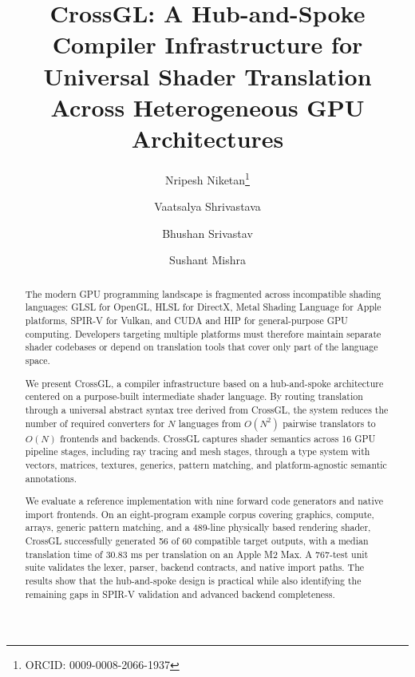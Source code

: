 \documentclass{svproc}
\begin{document}
\raggedbottom
\mainmatter

\title{CrossGL: A Hub-and-Spoke Compiler Infrastructure for Universal Shader Translation Across Heterogeneous GPU Architectures}


\author{Nripesh Niketan\thanks{ORCID: 0009-0008-2066-1937} \and Vaatsalya Shrivastava \and Bhushan Srivastav \and Sushant Mishra}

\maketitle

\begin{abstract}
The modern GPU programming landscape is fragmented across incompatible shading languages: GLSL for OpenGL, HLSL for DirectX, Metal Shading Language for Apple platforms, SPIR-V for Vulkan, and CUDA and HIP for general-purpose GPU computing. Developers targeting multiple platforms must therefore maintain separate shader codebases or depend on translation tools that cover only part of the language space.

We present CrossGL, a compiler infrastructure based on a hub-and-spoke architecture centered on a purpose-built intermediate shader language. By routing translation through a universal abstract syntax tree derived from CrossGL, the system reduces the number of required converters for $N$ languages from $O(N^2)$ pairwise translators to $O(N)$ frontends and backends. CrossGL captures shader semantics across 16 GPU pipeline stages, including ray tracing and mesh stages, through a type system with vectors, matrices, textures, generics, pattern matching, and platform-agnostic semantic annotations.

We evaluate a reference implementation with nine forward code generators and native import frontends. On an eight-program example corpus covering graphics, compute, arrays, generic pattern matching, and a 489-line physically based rendering shader, CrossGL successfully generated 56 of 60 compatible target outputs, with a median translation time of 30.83 ms per translation on an Apple M2 Max. A 767-test unit suite validates the lexer, parser, backend contracts, and native import paths. The results show that the hub-and-spoke design is practical while also identifying the remaining gaps in SPIR-V validation and advanced backend completeness.

\end{abstract}
\end{document}
